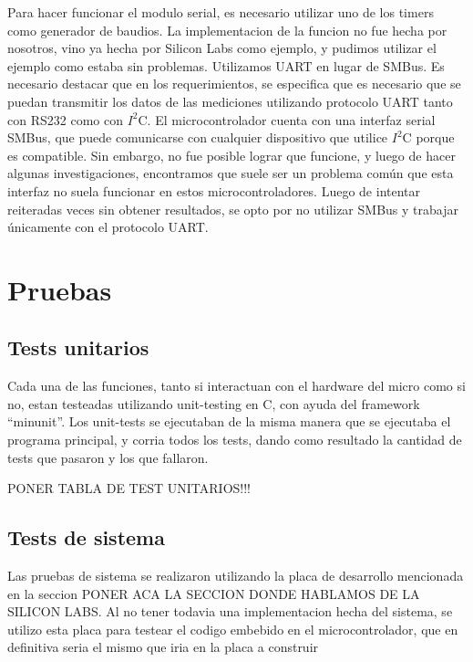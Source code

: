 Para hacer funcionar el modulo serial, es necesario utilizar uno de los timers como generador de baudios. La implementacion de la funcion no fue hecha por nosotros, vino ya hecha por Silicon Labs como ejemplo, y pudimos utilizar el ejemplo como estaba sin problemas. Utilizamos UART en lugar de SMBus. Es necesario destacar que en los requerimientos, se especifica que es necesario que se puedan transmitir los datos de las mediciones utilizando protocolo UART tanto con RS232 como con $I^{2}$C. El microcontrolador cuenta con una interfaz serial  SMBus, que puede comunicarse con cualquier dispositivo que utilice $I^{2}$C porque es compatible. Sin embargo, no fue posible lograr que funcione, y luego de hacer algunas investigaciones, encontramos que suele ser un problema común que esta interfaz no suela funcionar en estos microcontroladores. Luego de intentar reiteradas veces sin obtener resultados, se opto por no utilizar SMBus y trabajar únicamente con el protocolo UART.



\section{Pruebas} %
\label{it2:sec:pruebas}


\subsection{Tests unitarios} %
\label{it2:sub:tests_unitarios}

Cada una de las funciones, tanto si interactuan con el hardware del micro como si no, estan testeadas utilizando unit-testing en C, con ayuda del framework ``minunit''\cite{minunit}. Los unit-tests se ejecutaban de la misma manera que se ejecutaba el programa principal, y corria todos los tests, dando como resultado la cantidad de tests que pasaron y los que fallaron.

PONER TABLA DE TEST UNITARIOS!!!


\subsection{Tests de sistema} %
\label{it2:sub:tests_de_sistema}

Las pruebas de sistema se realizaron utilizando la placa de desarrollo mencionada en la seccion PONER ACA LA SECCION DONDE HABLAMOS DE LA SILICON LABS. Al no tener todavia una implementacion hecha del sistema, se utilizo esta placa para testear el codigo embebido en el microcontrolador, que en definitiva seria el mismo que iria en la placa a construir

